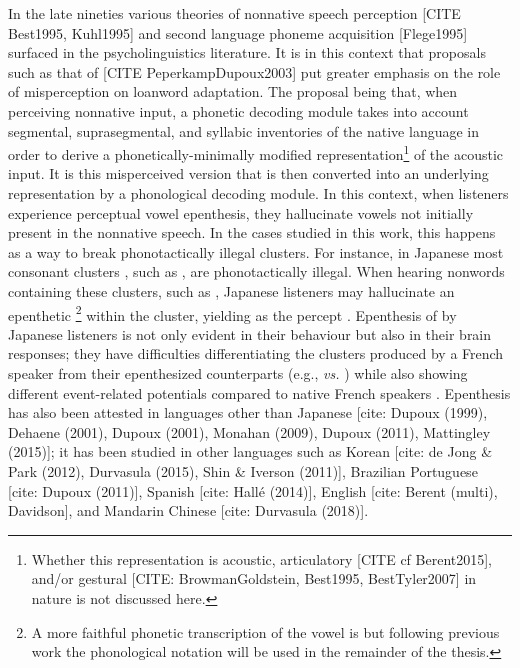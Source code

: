 In the late nineties various theories of nonnative speech perception [CITE Best1995, Kuhl1995] and second language phoneme acquisition [Flege1995] surfaced in the psycholinguistics literature.  
It is in this context that proposals such as that of [CITE PeperkampDupoux2003] put greater emphasis on the role of misperception on loanword adaptation. The proposal being that, when perceiving nonnative input, a phonetic decoding module takes into account segmental, suprasegmental, and syllabic inventories of the native language in order to derive a phonetically-minimally modified representation\footnote{Whether this representation is acoustic, articulatory [CITE cf Berent2015], and/or gestural [CITE: BrowmanGoldstein, Best1995, BestTyler2007] in nature is not discussed here.} of the acoustic input. It is this misperceived version that is then converted into an underlying representation by a phonological decoding module.  
In this context, when listeners experience perceptual vowel epenthesis, they hallucinate vowels not initially present in the nonnative speech. In the cases studied in this work, this happens as a way to break phonotactically illegal clusters. For instance, in Japanese most consonant clusters%
, such as , are phonotactically illegal. When hearing nonwords containing these clusters, such as , Japanese listeners may hallucinate an epenthetic \footnote{A more faithful phonetic transcription of the vowel is \textipa{[W]} but following previous work the phonological notation  will be used in the remainder of the thesis.} within the cluster, yielding  as the percept \cite{dupoux1999}. Epenthesis of  by Japanese listeners is not only evident in their behaviour but also in their brain responses; they have difficulties differentiating the clusters produced by a French speaker from their epenthesized counterparts (e.g.,  \textit{vs.} ) while also showing different event-related potentials compared to native French speakers \cite{dehaene2000}.
Epenthesis has also been attested in languages other than Japanese [cite: Dupoux (1999), Dehaene (2001), Dupoux (2001), Monahan (2009), Dupoux (2011), Mattingley (2015)]; it has been studied in other languages such as Korean [cite: de Jong \& Park (2012), Durvasula (2015), Shin \& Iverson (2011)], Brazilian Portuguese [cite: Dupoux (2011)], Spanish [cite: Hallé (2014)], English [cite: Berent (multi), Davidson], and Mandarin Chinese [cite: Durvasula (2018)].


